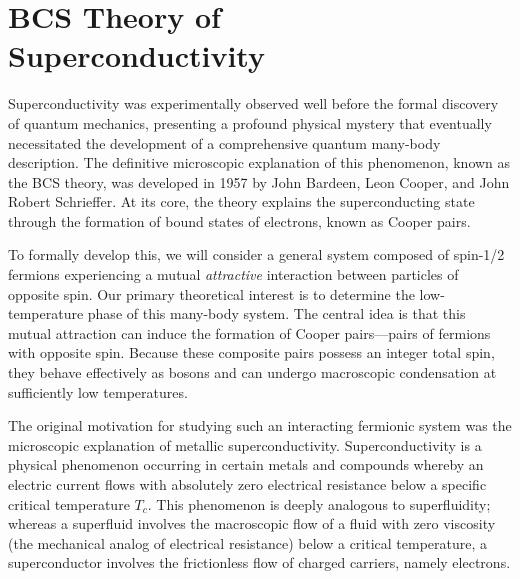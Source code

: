 \chapter[BCS Theory of Superconductivity]{BCS Theory of\\Superconductivity}

Superconductivity was experimentally observed well before the formal discovery of quantum mechanics, presenting a profound physical mystery that eventually necessitated the development of a comprehensive quantum many-body description. The definitive microscopic explanation of this phenomenon, known as the BCS theory, was developed in 1957 by John Bardeen, Leon Cooper, and John Robert Schrieffer. At its core, the theory explains the superconducting state through the formation of bound states of electrons, known as Cooper pairs.

To formally develop this, we will consider a general system composed of spin-1/2 fermions experiencing a mutual \emph{attractive} interaction between particles of opposite spin. Our primary theoretical interest is to determine the low-temperature phase of this many-body system. The central idea is that this mutual attraction can induce the formation of Cooper pairs—pairs of fermions with opposite spin. Because these composite pairs possess an integer total spin, they behave effectively as bosons and can undergo macroscopic condensation at sufficiently low temperatures.

The original motivation for studying such an interacting fermionic system was the microscopic explanation of metallic superconductivity. Superconductivity is a physical phenomenon occurring in certain metals and compounds whereby an electric current flows with absolutely zero electrical resistance below a specific critical temperature \( T_c \). This phenomenon is deeply analogous to superfluidity; whereas a superfluid involves the macroscopic flow of a fluid with zero viscosity (the mechanical analog of electrical resistance) below a critical temperature, a superconductor involves the frictionless flow of charged carriers, namely electrons.

